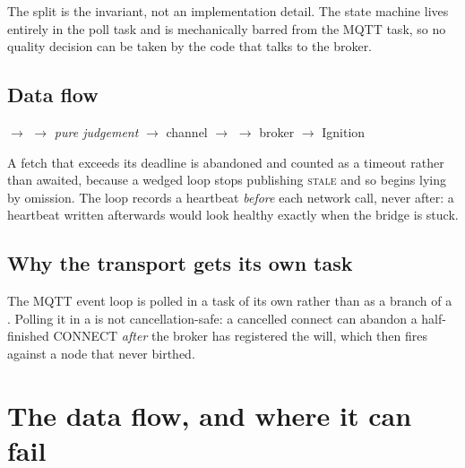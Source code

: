 The split is the invariant, not an implementation detail. The state machine lives entirely
in the poll task and is mechanically barred from the MQTT task, so no quality decision can
be taken by the code that talks to the broker.

\subsection{Data flow}

\begin{center}
 $\rightarrow$  $\rightarrow$
\emph{pure judgement} $\rightarrow$ channel $\rightarrow$ 
$\rightarrow$ broker $\rightarrow$ Ignition
\end{center}

A fetch that exceeds its deadline is abandoned and counted as a timeout rather than
awaited, because a wedged loop stops publishing \textsc{stale} and so begins lying by
omission. The loop records a heartbeat \emph{before} each network call, never after: a
heartbeat written afterwards would look healthy exactly when the bridge is stuck.

\subsection{Why the transport gets its own task}

The MQTT event loop is polled in a task of its own rather than as a branch of a
. Polling it in a  is not cancellation-safe: a cancelled
connect can abandon a half-finished CONNECT \emph{after} the broker has registered the
will, which then fires against a node that never birthed.

\section{The data flow, and where it can fail}
\label{sec:dataflow}

